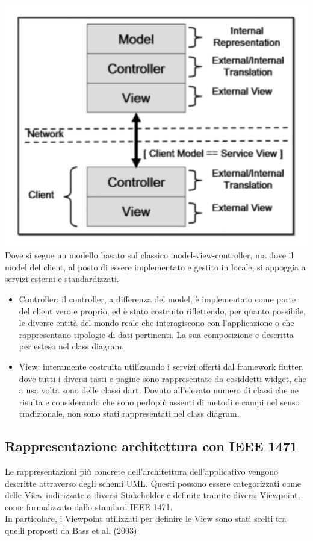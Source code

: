 \documentclass{article}
\begin{document}
\\\includegraphics[scale = 0.45]{"Immagini/controllerViewArch.png"}
\\Dove si segue un modello basato sul classico model-view-controller, ma dove il model del client, al posto di essere implementato e gestito in locale, si appoggia a servizi esterni e standardizzati. 
\begin{itemize}
    \item Controller: il controller, a differenza del model, è implementato come parte del client vero e proprio, ed è stato costruito riflettendo, per quanto possibile, le diverse entità del mondo reale che interagiscono con l’applicazione o che rappresentano tipologie di dati pertinenti. La sua composizione e descritta per esteso nel class diagram.
    \item View: interamente costruita utilizzando i servizi offerti dal framework flutter, dove tutti i diversi tasti e pagine sono rappresentate da cosiddetti widget, che a usa volta sono delle classi dart. Dovuto all’elevato numero di classi che ne risulta e considerando che sono perlopiù assenti di metodi e campi nel senso tradizionale, non sono stati rappresentati nel class diagram. 
    \end{itemize}
\subsection{Rappresentazione architettura con IEEE 1471} 
Le rappresentazioni più concrete dell'architettura dell'applicativo vengono descritte attraverso degli schemi UML. Questi possono essere categorizzati come delle View indirizzate a diversi Stakeholder e definite tramite diversi Viewpoint, come formalizzato dallo standard IEEE 1471.
\\In particolare, i Viewpoint utilizzati per definire le View sono stati scelti tra quelli proposti da Bass et al. (2003).
\end{document}
